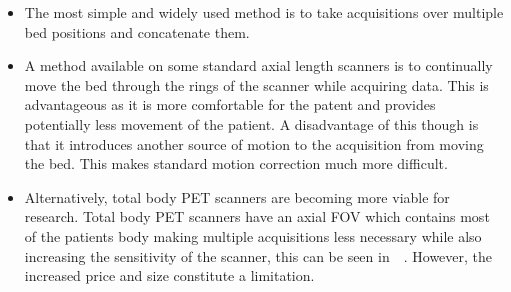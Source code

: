                 \begin{itemize}
                    \item The most simple and widely used method is to take acquisitions over multiple bed positions and concatenate them.
                    
                    \item A method available on some  standard axial length scanners is to continually move the bed through the rings of the scanner while acquiring data. This is advantageous as it is more comfortable for the patent and provides potentially less movement of the patient. %
                    A disadvantage of this though is that it introduces another source of motion to the acquisition from moving the bed. This makes standard motion correction much more difficult.
                    
                    \item Alternatively, total body \gls{PET} scanners are becoming more viable for research. %
                    Total body \gls{PET} scanners have an axial \gls{FOV} which contains most of the patients body making multiple acquisitions less necessary while also increasing the sensitivity of the scanner, this can be seen in~~\parencite{Cherry2018}. However, the increased price and size constitute a limitation.
                \end{itemize}
            
